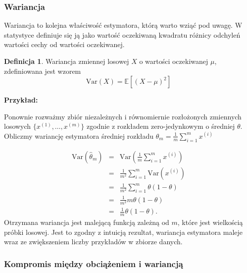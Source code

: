 \documentclass[11pt]{book}
\theoremstyle{definition}
\newtheorem{definition}{Definicja}[section]
\begin{document}
\subsubsection{Wariancja}

Wariancja to kolejna właściwość estymatora, którą warto wziąć pod uwagę. W statystyce definiuje się ją jako wartość oczekiwaną kwadratu różnicy odchyleń wartości cechy od wartości oczekiwanej. 
%
\begin{definition}
Wariancja zmiennej losowej $X$ o wartości oczekiwanej $\mu$, zdefiniowana jest wzorem
\begin{equation}
\text{Var}(X) = \mathbb{E} \left[ \left(X - \mu \right)^2 \right]
\end{equation}
\end{definition}
\noindent\textbf{Przykład:} 

\noindent Ponownie rozważmy zbiór niezależnych i równomiernie rozłożonych zmiennych losowych $\{{ x^{(1)}, \dots, x^{(m)} }\}$ zgodnie z rozkładem zero-jedynkowym o średniej $\theta$. Obliczmy wariancję estymatora średniej rozkładu $\theta_m = \frac{1}{m} \sum_{i=1}^m x^{(i)}$


\begin{eqnarray}
\text{Var}\left(\hat{\theta}_m\right) &=& \text{Var}\left( \frac{1}{m} \sum_{i=1}^m x^{(i)} \right) \nonumber \\
&=& \frac{1}{m^2} \sum_{i=1}^m   \text{Var} \left( x^{(i)} \right) \nonumber \\
&=& \frac{1}{m^2} \sum_{i=1}^m   \theta \left( 1-\theta \right) \nonumber \\
&=& \frac{1}{m^2} m \theta \left( 1-\theta \right) \nonumber \\
&=& \frac{1}{m} \theta \left( 1-\theta \right).
\end{eqnarray}
%
Otrzymana wariancja jest malejącą funkcją zależną od $m$, które jest wielkością próbki losowej. Jest to zgodny z intuicją rezultat, wariancja estymatora maleje wraz ze zwiększeniem liczby przykładów w zbiorze danych.

\subsubsection{Kompromis między obciążeniem i wariancją}
\end{document}
